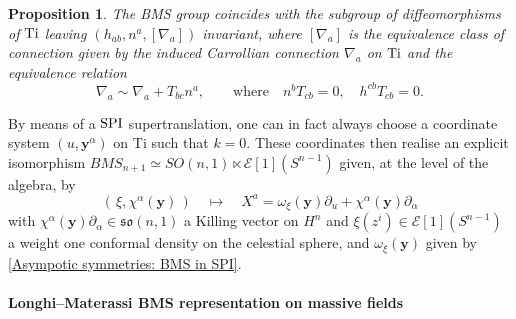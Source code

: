 \documentclass[a4paper, 10pt]{article}
\newtheorem{proposition}{Proposition}[section]
\theoremstyle{remark}
\newcommand{\Ti}{\textnormal{Ti}}
\newcommand{\y}{\bm{y}}
\newcommand{\SPI}{\textnormal{SPI}}%
\begin{document}
\begin{proposition}\label{Proposition: BMS group inside SPI}
    The BMS group coincides with the subgroup of diffeomorphisms of $\Ti$ leaving $(h_{ab},n^a, [\nabla_a])$ invariant, where $[\nabla_a]$ is the equivalence class of connection given by the induced Carrollian connection $\nabla_a$ on $\Ti$ and the equivalence relation
    \begin{equation*}
        \nabla_a \sim \nabla_a  + T_{bc} n^a, \qquad\textrm{where}\quad n^bT_{cb}=0,\quad h^{cb}T_{cb}=0.
    \end{equation*}
\end{proposition}

By means of a $\SPI$ supertranslation, one can in fact always choose a coordinate system $(u,\y^{\alpha})$ on Ti such that $k=0$. These coordinates then realise an explicit isomorphism $BMS_{n+1} \simeq  SO(n,1)  \ltimes \mathcal{E}[1](S^{n-1})$ given, at the level of the algebra, by
\begin{equation}\label{Carrollian connection:  BMS at Ti}
   (\,\xi , \chi^{\alpha}(\y)\,)  \quad \mapsto \quad X^a =  \omega_{\xi}(\y) \partial_u + \chi^{\alpha}(\y) \partial_{\alpha} 
\end{equation}
with $\chi^{\alpha}(\y) \partial_{\alpha} \in \mathfrak{so}(n,1)$ a Killing vector on $H^n$ and $\xi(z^i) \in \mathcal{E}[1](S^{n-1})$ a weight one conformal density on the celestial sphere, and $\omega_{\xi}(\y)$ given by \eqref{Asympotic symmetries: BMS in SPI}.

\paragraph{Longhi--Materassi BMS representation on massive fields}\mbox{}
\end{document}

